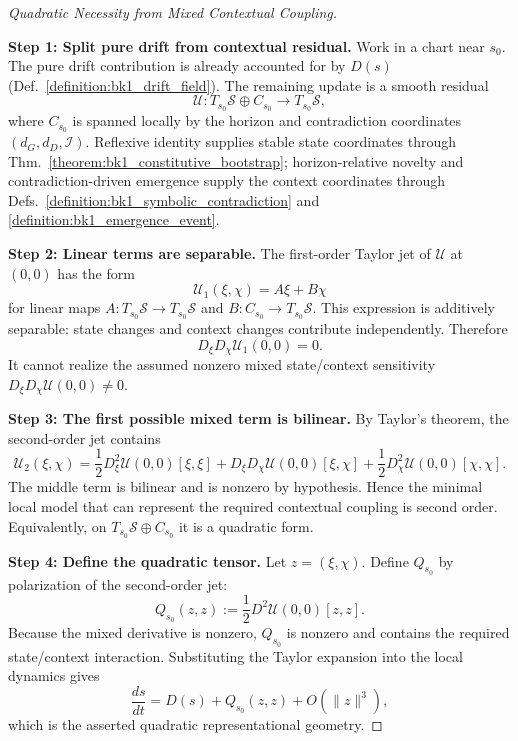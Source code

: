 \begin{proof}[Quadratic Necessity from Mixed Contextual Coupling]
\label{proof:bk1_geometric_necessity_curvature}
\leavevmode

\textbf{Step 1: Split pure drift from contextual residual.}
Work in a chart near \(s_0\). The pure drift contribution is already accounted
for by \(D(s)\) (Def.~\ref{definition:bk1_drift_field}). The remaining update
is a smooth residual
\[
\mathcal{U}: T_{s_0}\mathcal{S}\oplus C_{s_0}\to T_{s_0}\mathcal{S},
\]
where \(C_{s_0}\) is spanned locally by the horizon and contradiction
coordinates \((d_G,d_D,\mathcal{I})\). Reflexive identity supplies stable
state coordinates through Thm.~\ref{theorem:bk1_constitutive_bootstrap};
horizon-relative novelty and contradiction-driven emergence supply the
context coordinates through Defs.~\ref{definition:bk1_symbolic_contradiction}
and \ref{definition:bk1_emergence_event}.

\textbf{Step 2: Linear terms are separable.}
The first-order Taylor jet of \(\mathcal{U}\) at \((0,0)\) has the form
\[
\mathcal{U}_1(\xi,\chi)=A\xi+B\chi
\]
for linear maps \(A:T_{s_0}\mathcal{S}\to T_{s_0}\mathcal{S}\) and
\(B:C_{s_0}\to T_{s_0}\mathcal{S}\). This expression is additively separable:
state changes and context changes contribute independently. Therefore
\[
D_\xi D_\chi \mathcal{U}_1(0,0)=0.
\]
It cannot realize the assumed nonzero mixed state/context sensitivity
\(D_\xi D_\chi \mathcal{U}(0,0)\neq 0\).

\textbf{Step 3: The first possible mixed term is bilinear.}
By Taylor's theorem, the second-order jet contains
\[
\mathcal{U}_2(\xi,\chi)
=\frac12 D_\xi^2\mathcal{U}(0,0)[\xi,\xi]
+D_\xi D_\chi\mathcal{U}(0,0)[\xi,\chi]
+\frac12 D_\chi^2\mathcal{U}(0,0)[\chi,\chi].
\]
The middle term is bilinear and is nonzero by hypothesis. Hence the minimal
local model that can represent the required contextual coupling is second
order. Equivalently, on \(T_{s_0}\mathcal{S}\oplus C_{s_0}\) it is a quadratic
form.

\textbf{Step 4: Define the quadratic tensor.}
Let \(z=(\xi,\chi)\). Define \(Q_{s_0}\) by polarization of the second-order
jet:
\[
Q_{s_0}(z,z)
:=\frac12 D^2\mathcal{U}(0,0)[z,z].
\]
Because the mixed derivative is nonzero, \(Q_{s_0}\) is nonzero and contains
the required state/context interaction. Substituting the Taylor expansion into
the local dynamics gives
\[
\frac{ds}{dt}
=D(s)+Q_{s_0}(z,z)+O(\|z\|^3),
\]
which is the asserted quadratic representational geometry.
\end{proof}

